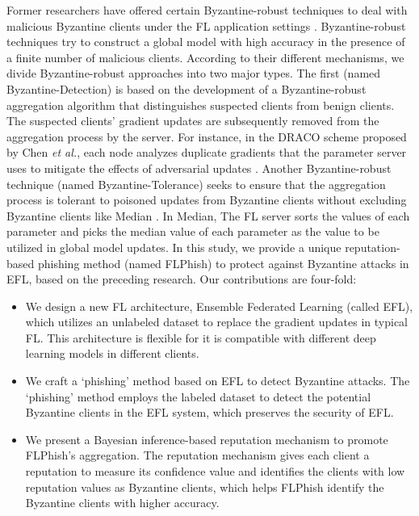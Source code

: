\documentclass[lettersize,journal]{IEEEtran}
\begin{document}
\par Former researchers have offered certain Byzantine-robust techniques to deal with malicious Byzantine clients under the FL application settings \cite{ref_12_defense,ref_13_defense,ref_15_defense,ref_16_defense,ref_17_defense,ref_28_defense,ref_29_defense,ref_30_defense,ref_31_defense,ref_32_defense}. Byzantine-robust techniques try to construct a global model with high accuracy in the presence of a finite number of malicious clients. According to their different mechanisms, we divide Byzantine-robust approaches into two major types. The first (named Byzantine-Detection) is based on the development of a Byzantine-robust aggregation algorithm that distinguishes suspected clients from benign clients. The suspected clients' gradient updates are subsequently removed from the aggregation process by the server. For instance, in the DRACO scheme proposed by Chen \textit{et al.}, each node analyzes duplicate gradients that the parameter server uses to mitigate the effects of adversarial updates \cite{ref_13_defense}. Another Byzantine-robust technique (named Byzantine-Tolerance) seeks to ensure that the aggregation process is tolerant to poisoned updates from Byzantine clients without excluding Byzantine clients like Median \cite{ref_16_defense}. In Median, The FL server sorts the values of each parameter and picks the median value of each parameter as the value to be utilized in global model updates. In this study, we provide a unique reputation-based phishing method (named FLPhish) to protect against Byzantine attacks in EFL, based on the preceding research. Our contributions are four-fold:
\begin{itemize}
  \item We design a new FL architecture, Ensemble Federated Learning (called EFL), which utilizes an unlabeled dataset to replace the gradient updates in typical FL. This architecture is flexible for it is compatible with different deep learning models in different clients.
  \item We craft a `phishing' method based on EFL to detect Byzantine attacks. The `phishing' method employs the labeled dataset to detect the potential Byzantine clients in the EFL system, which preserves the security of EFL.
  \item We present a Bayesian inference-based reputation mechanism to promote FLPhish's aggregation. The reputation mechanism gives each client a reputation to measure its confidence value and identifies the clients with low reputation values as Byzantine clients, which helps FLPhish identify the Byzantine clients with higher accuracy.
\end{itemize}
\end{document}
